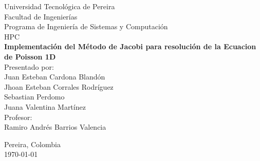 \begin{titlepage}
    \centering
    \vspace*{0.5cm}
    
    {\Large Universidad Tecnológica de Pereira}\\[0.5cm]
    {\large Facultad de Ingenierías}\\[0.3cm]
    {\large Programa de Ingeniería de Sistemas y Computación}\\[0.3cm]
    {\large HPC}\\[3cm]
    
    {\LARGE\textbf{Implementación del Método de Jacobi para resolución de la Ecuacion de Poisson 1D}}\\[2cm]
        
    {\large Presentado por:}\\[0.3cm]
    {\large Juan Esteban Cardona Blandón}\\[0.3cm]
    {\large Jhoan Esteban Corrales Rodríguez}\\[0.3cm]
    {\large Sebastian Perdomo}\\[0.3cm]
    {\large Juana Valentina Martínez}\\[1cm]
    {\large Profesor:}\\[0.3cm]
    {\large Ramiro Andrés Barrios Valencia}\\[0.3cm]
        
    \vfill
    
    {\large Pereira, Colombia}\\[0.3cm]
    {\large \today}
    
\end{titlepage}